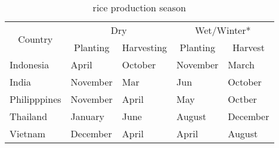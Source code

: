 \begin{table}
\centering
\caption{rice production season}
\label{table:rice-production-season}
\begin{tabular}{lllll}
\multicolumn{1}{c}{\multirow{2}{*}{Country}} & \multicolumn{2}{c}{Dry}                                       & \multicolumn{2}{c}{Wet/Winter*}                            \\
\multicolumn{1}{c}{}                         & \multicolumn{1}{c}{Planting} & \multicolumn{1}{c}{Harvesting} & \multicolumn{1}{c}{Planting} & \multicolumn{1}{c}{Harvest} \\
Indonesia                                    & April                        & October                        & November                     & March                       \\
India                                        & November                     & Mar                            & Jun                          & October                     \\
Philipppines                                 & November                     & April                          & May                          & Octber                      \\
Thailand                                     & January                      & June                           & August                       & December                    \\
Vietnam                                      & December                     & April                          & April                        & August                     
\end{tabular}
\end{table}